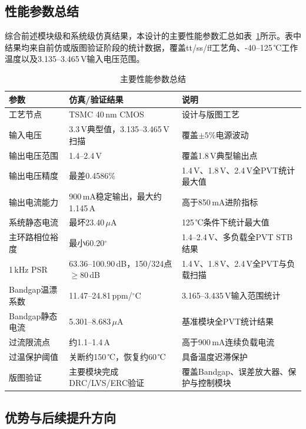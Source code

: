 \documentclass[a4paper, 12pt]{article}
\begin{document}
\subsection{性能参数总结}

综合前述模块级和系统级仿真结果，本设计的主要性能参数汇总如表~\ref{tab:performance-summary}所示。表中结果均来自前仿或版图验证阶段的统计数据，覆盖tt/ss/ff工艺角、-40--125\,℃工作温度以及3.135--3.465\,V输入电压范围。

\begin{table}[H]
  \centering
  \small
  \setlength{\tabcolsep}{4pt}
  \begin{tabularx}{\textwidth}{lXX}
    \toprule
    参数 & 仿真/验证结果 & 说明 \\
    \midrule
    工艺节点 & TSMC 40\,nm CMOS & 设计与版图工艺 \\
    输入电压 & 3.3\,V典型值，3.135--3.465\,V扫描 & 覆盖$\pm5\%$电源波动 \\
    输出电压范围 & 1.4--2.4\,V & 覆盖1.8\,V典型输出点 \\
    输出电压精度 & 最差0.4586\% & 1.4\,V、1.8\,V、2.4\,V全PVT统计最大值 \\
    输出电流能力 & 900\,mA稳定输出，最大约1.145\,A & 高于850\,mA进阶指标 \\
    系统静态电流 & 最坏23.40\,$\mu$A & 125\,℃条件下统计最大值 \\
    主环路相位裕度 & 最小60.20$^\circ$ & 1.4--2.4\,V、多负载全PVT STB结果 \\
    1\,kHz PSR & 63.36--100.90\,dB，150/324点$\geq$80\,dB & 1.4\,V、1.8\,V、2.4\,V全PVT与负载扫描 \\
    Bandgap温漂系数 & 11.47--24.81\,ppm/$^\circ$C & 3.165--3.435\,V输入范围统计 \\
    Bandgap静态电流 & 5.301--8.683\,$\mu$A & 基准模块全PVT统计结果 \\
    过流限流点 & 约1.1--1.4\,A & 高于900\,mA连续负载电流 \\
    过温保护阈值 & 关断约150\,℃，恢复约60\,℃ & 具备温度迟滞保护 \\
    版图验证 & 主要模块完成DRC/LVS/ERC验证 & 覆盖Bandgap、误差放大器、保护与控制模块 \\
    \bottomrule
  \end{tabularx}
  \caption{主要性能参数总结}
  \label{tab:performance-summary}
\end{table}

\subsection{优势与后续提升方向}
\end{document}
